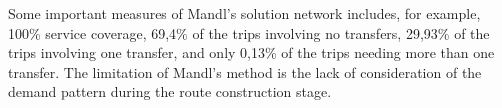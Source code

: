 
Some important measures of Mandl's solution network includes, for example, 100\% service coverage, 69,4\% of the trips involving no transfers, 29,93\% of the trips involving one transfer, and only 0,13\% of the trips needing more than one transfer. The limitation of Mandl's method is the lack of consideration of the demand pattern during the route construction stage.\citep{zhao03}






